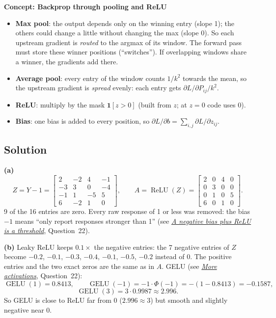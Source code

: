 \documentclass[12pt,a4paper]{article}
\newcommand{\concept}[2]{\par\medskip\phantomsection\label{#1}{\large\bfseries\color{blue!50!black} Concept: #2}\par}
\newcommand{\seeconcept}[3]{(see \hyperref[#1]{\textit{#2}}, Question~#3)}
\newcommand{\relu}{\operatorname{ReLU}}
\begin{document}
\concept{c:poolback}{Backprop through pooling and ReLU}
\begin{itemize}[nosep]
\item \textbf{Max pool}: the output depends only on the winning entry (slope 1); the others could change a little without changing the max (slope 0). So each upstream gradient is \emph{routed} to the argmax of its window. The forward pass must store these winner positions (``switches''). If overlapping windows share a winner, the gradients add there.
\item \textbf{Average pool}: every entry of the window counts $1/k^2$ towards the mean, so the upstream gradient is \emph{spread} evenly: each entry gets $\partial L/\partial P_{ij}/k^2$.
\item \textbf{ReLU}: multiply by the mask $\mathbf 1[z>0]$ (built from $z$; at $z=0$ code uses 0).
\item \textbf{Bias}: one bias is added to every position, so $\partial L/\partial b=\sum_{i,j}\partial L/\partial z_{ij}$.
\end{itemize}

\subsection*{Solution}
\textbf{(a)}
\[
Z=Y-1=\begin{bmatrix}2&-2&4&-1\\-3&3&0&-4\\-1&1&-5&5\\6&-2&1&0\end{bmatrix},\qquad
A=\relu(Z)=\begin{bmatrix}2&0&4&0\\0&3&0&0\\0&1&0&5\\6&0&1&0\end{bmatrix}.
\]
9 of the 16 entries are zero. Every raw response of 1 or less was removed: the bias $-1$ means ``only report responses stronger than 1'' \seeconcept{c:biasthresh}{A negative bias plus ReLU is a threshold}{22}.

\textbf{(b)} Leaky ReLU keeps $0.1\times$ the negative entries: the 7 negative entries of $Z$ become $-0.2$, $-0.1$, $-0.3$, $-0.4$, $-0.1$, $-0.5$, $-0.2$ instead of 0. The positive entries and the two exact zeros are the same as in $A$. GELU \seeconcept{c:acts2}{More activations}{22}:
\[
\operatorname{GELU}(1)=0.8413,\qquad \operatorname{GELU}(-1)=-1\cdot\Phi(-1)=-(1-0.8413)=-0.1587,
\]
\[
\operatorname{GELU}(3)=3\cdot0.9987\approx2.996 .
\]
So GELU is close to ReLU far from 0 ($2.996\approx3$) but smooth and slightly negative near 0.
\end{document}
